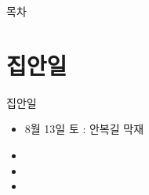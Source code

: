 \documentclass[aspectratio=1610,17pt,xcolor=pdftex,dvipsnames,table,handout]{beamer}
\begin{document}
		\begin{frame} [plain]{목차}
		\tableofcontents
		\end{frame}
		


		\section{집안일}
		\frame [plain] {\sectionpage}

		\begin{frame} [t,plain]
			\begin{block} {집안일}
			\begin{itemize}
				\item 8월 13일 토 : 안복길 막재
				\item 
				\item 
				\item 
			\end{itemize}
			\end{block}
		\end{frame}



\end{document}
